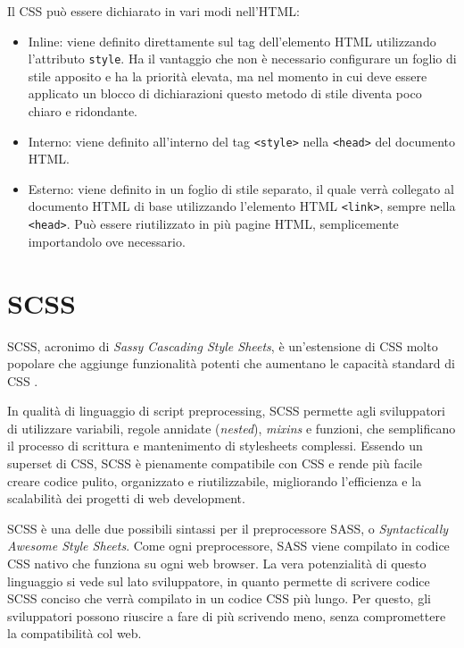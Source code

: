 Il CSS può essere dichiarato in vari modi nell'HTML:
\begin{itemize}
    \item Inline: viene definito direttamente sul tag dell'elemento HTML utilizzando l'attributo \Verb_style_. Ha il vantaggio che non è necessario configurare un foglio di stile apposito e ha la priorità elevata, ma nel momento in cui deve essere applicato un blocco di dichiarazioni questo metodo di stile diventa poco chiaro e ridondante.
    \item Interno: viene definito all'interno del tag \Verb_<style>_ nella \Verb_<head>_ del documento HTML.
    \item Esterno: viene definito in un foglio di stile separato, il quale verrà collegato al documento HTML di base utilizzando l'elemento HTML \Verb_<link>_, sempre nella \Verb_<head>_. Può essere riutilizzato in più pagine HTML, semplicemente importandolo ove necessario.
\end{itemize}

\section{SCSS}
SCSS, acronimo di \textit{Sassy Cascading Style Sheets}, è un'estensione di CSS molto popolare che aggiunge funzionalità potenti che aumentano le capacità standard di CSS \cite{SASS, SCSS_SASS}.

In qualità di linguaggio di script preprocessing, SCSS permette agli sviluppatori di utilizzare variabili, regole annidate (\textit{nested}), \textit{mixins} e funzioni, che semplificano il processo di scrittura e mantenimento di stylesheets complessi. Essendo un superset di CSS, SCSS è pienamente compatibile con CSS e rende più facile creare codice pulito, organizzato e riutilizzabile, migliorando l'efficienza e la scalabilità dei progetti di web development.


SCSS è una delle due possibili sintassi per il preprocessore SASS, o \textit{Syntactically Awesome Style Sheets}. Come ogni preprocessore, SASS viene compilato in codice CSS nativo che funziona su ogni web browser. La vera potenzialità di questo linguaggio si vede sul lato sviluppatore, in quanto permette di scrivere codice SCSS conciso che verrà compilato in un codice CSS più lungo. Per questo, gli sviluppatori possono riuscire a fare di più scrivendo meno, senza compromettere la compatibilità col web.

